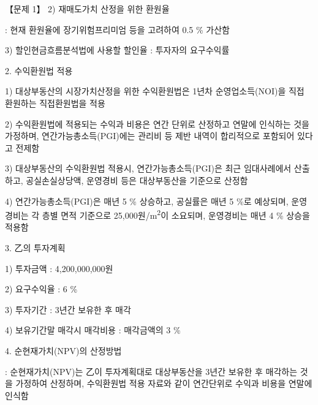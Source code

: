 \begin{longquestion}{【문제 1】}
2) 재매도가치 산정을 위한 환원율 \par
: 현재 환원율에 장기위험프리미엄 등을 고려하여 0.5 \% 가산함 \par
3) 할인현금흐름분석법에 사용할 할인율 : 투자자의 요구수익률 \par
2. 수익환원법 적용 \par
1) 대상부동산의 시장가치산정을 위한 수익환원법은 1년차 순영업소득(NOI)을 직접 환원하는 직접환원법을 적용 \par
2) 수익환원법에 적용되는 수익과 비용은 연간 단위로 산정하고 연말에 인식하는 것을 가정하며, 연간가능총소득(PGI)에는 관리비 등 제반 내역이 합리적으로 포함되어 있다고 전제함 \par
3) 대상부동산의 수익환원법 적용시, 연간가능총소득(PGI)은 최근 임대사례에서 산출하고, 공실손실상당액, 운영경비 등은 대상부동산을 기준으로 산정함 \par
4) 연간가능총소득(PGI)은 매년 5 \% 상승하고, 공실률은 매년 5 \%로 예상되며, 운영경비는 각 층별 면적 기준으로 25,000원/m\textsuperscript{2}이 소요되며, 운영경비는 매년 4 \% 상승을 적용함 \par
3. 乙의 투자계획 \par
1) 투자금액 : 4,200,000,000원 \par
2) 요구수익율 : 6 \% \par
3) 투자기간 : 3년간 보유한 후 매각 \par
4) 보유기간말 매각시 매각비용 : 매각금액의 3 \% \par
4. 순현재가치(NPV)의 산정방법 \par
: 순현재가치(NPV)는 乙이 투자계획대로 대상부동산을 3년간 보유한 후 매각하는 것을 가정하여 산정하며, 수익환원법 적용 자료와 같이 연간단위로 수익과 비용을 연말에 인식함 \par
\end{longquestion}
